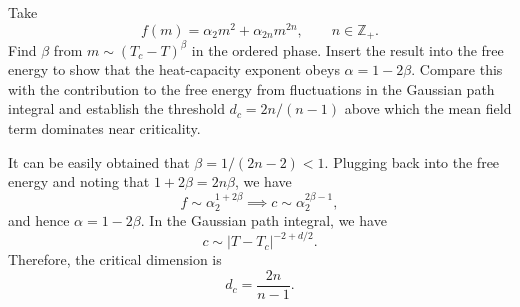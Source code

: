 Take
\begin{equation}
    f(m)=\alpha_2m^2+\alpha_{2n}m^{2n},
    \qquad n\in\mathbb Z_+.
\end{equation}
Find $\beta$ from $m\sim(T_c-T)^\beta$ in the ordered phase.
Insert the result into the free energy to show that the heat-capacity
exponent obeys $\alpha=1-2\beta$. Compare this with the
contribution to the free energy from fluctuations in the Gaussian path integral and establish the threshold
$d_c=2n/(n-1)$ above which the mean field term dominates near criticality.
\begin{solution}
    It can be easily obtained that $\beta = 1/(2n-2) <1$. Plugging back into the free energy and noting that $1+2\beta = 2n\beta$, we have
    \begin{equation}
        f \sim \alpha_2^{1+2\beta} \implies c \sim \alpha_2^{2\beta - 1},
    \end{equation}
    and hence $\alpha = 1 - 2\beta$. In the Gaussian path integral, we have
    \begin{equation}
        c \sim |T-T_c|^{-2+d/2}.
    \end{equation}
    Therefore, the critical dimension is
    \begin{equation}
        d_c =\frac{2n}{n-1}.
    \end{equation}
\end{solution}
